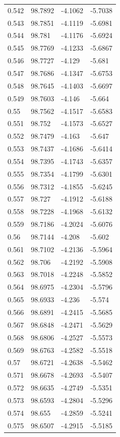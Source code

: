 \begin{tabular}{llll}
0.542 & 98.7892 & -4.1062 & -5.7038 \\
0.543 & 98.7851 & -4.1119 & -5.6981 \\
0.544 & 98.781 & -4.1176 & -5.6924 \\
0.545 & 98.7769 & -4.1233 & -5.6867 \\
0.546 & 98.7727 & -4.129 & -5.681 \\
0.547 & 98.7686 & -4.1347 & -5.6753 \\
0.548 & 98.7645 & -4.1403 & -5.6697 \\
0.549 & 98.7603 & -4.146 & -5.664 \\
0.55 & 98.7562 & -4.1517 & -5.6583 \\
0.551 & 98.752 & -4.1573 & -5.6527 \\
0.552 & 98.7479 & -4.163 & -5.647 \\
0.553 & 98.7437 & -4.1686 & -5.6414 \\
0.554 & 98.7395 & -4.1743 & -5.6357 \\
0.555 & 98.7354 & -4.1799 & -5.6301 \\
0.556 & 98.7312 & -4.1855 & -5.6245 \\
0.557 & 98.727 & -4.1912 & -5.6188 \\
0.558 & 98.7228 & -4.1968 & -5.6132 \\
0.559 & 98.7186 & -4.2024 & -5.6076 \\
0.56 & 98.7144 & -4.208 & -5.602 \\
0.561 & 98.7102 & -4.2136 & -5.5964 \\
0.562 & 98.706 & -4.2192 & -5.5908 \\
0.563 & 98.7018 & -4.2248 & -5.5852 \\
0.564 & 98.6975 & -4.2304 & -5.5796 \\
0.565 & 98.6933 & -4.236 & -5.574 \\
0.566 & 98.6891 & -4.2415 & -5.5685 \\
0.567 & 98.6848 & -4.2471 & -5.5629 \\
0.568 & 98.6806 & -4.2527 & -5.5573 \\
0.569 & 98.6763 & -4.2582 & -5.5518 \\
0.57 & 98.6721 & -4.2638 & -5.5462 \\
0.571 & 98.6678 & -4.2693 & -5.5407 \\
0.572 & 98.6635 & -4.2749 & -5.5351 \\
0.573 & 98.6593 & -4.2804 & -5.5296 \\
0.574 & 98.655 & -4.2859 & -5.5241 \\
0.575 & 98.6507 & -4.2915 & -5.5185 \\

\end{tabular}
